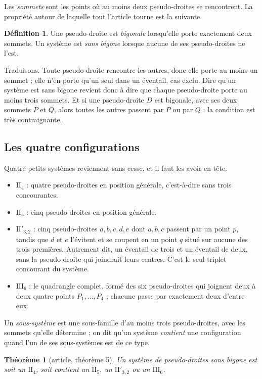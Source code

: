 \documentclass[11pt,a4paper]{amsart}
\theoremstyle{definition}
\newtheorem{definition}{Définition}
\theoremstyle{plain}
\newtheorem{theoreme}{Théorème}
\theoremstyle{remark}
\newcommand{\II}[1]{\mathrm{II}_{#1}}
\newcommand{\IIp}{\mathrm{II}'_{3,2}}
\newcommand{\III}{\mathrm{III}_{6}}
\begin{document}
Les \emph{sommets} sont les points où au moins deux pseudo-droites se rencontrent. La propriété autour de laquelle tout l'article tourne est la suivante.

\begin{definition}
Une pseudo-droite est \emph{bigonale} lorsqu'elle porte exactement deux sommets. Un système est \emph{sans bigone} lorsque aucune de ses pseudo-droites ne l'est.
\end{definition}

Traduisons. Toute pseudo-droite rencontre les autres, donc elle porte au moins un sommet ; elle n'en porte qu'un seul dans un éventail, cas exclu. Dire qu'un système est sans bigone revient donc à dire que chaque pseudo-droite porte au moins trois sommets. Et si une pseudo-droite $D$ est bigonale, avec ses deux sommets $P$ et $Q$, alors toutes les autres passent par $P$ ou par $Q$ : la condition est très contraignante.

\subsection*{Les quatre configurations}

Quatre petits systèmes reviennent sans cesse, et il faut les avoir en tête.

\begin{itemize}
\item $\II4$ : quatre pseudo-droites en position générale, c'est-à-dire sans trois concourantes.
\item $\II5$ : cinq pseudo-droites en position générale.
\item $\IIp$ : cinq pseudo-droites $a, b, c, d, e$ dont $a, b, c$ passent par un point $p$, tandis que $d$ et $e$ l'évitent et se coupent en un point $q$ situé sur aucune des trois premières. Autrement dit, un éventail de trois et un éventail de deux, sans la pseudo-droite qui joindrait leurs centres. C'est le seul triplet concourant du système.
\item $\III$ : le quadrangle complet, formé des six pseudo-droites qui joignent deux à deux quatre points $P_1, \dots, P_4$ ; chacune passe par exactement deux d'entre eux.
\end{itemize}

Un \emph{sous-système} est une sous-famille d'au moins trois pseudo-droites, avec les sommets qu'elle détermine ; on dit qu'un système \emph{contient} une configuration quand l'un de ses sous-systèmes est de ce type.

\begin{theoreme}[article, théorème 5]
Un système de pseudo-droites sans bigone est soit un $\II4$, soit contient un $\II5$, un $\IIp$ ou un $\III$.
\end{theoreme}
\end{document}

